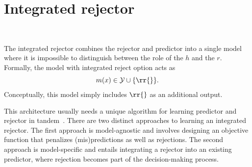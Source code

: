 \section{Integrated rejector}~\label{sec:integrated_rejector}

The integrated rejector combines the rejector and predictor into a single model where it is impossible to distinguish between the role of the $h$ and the $r$.  
Formally, the model with integrated reject option acts as
\begin{equation}
    m(x) \in \mathcal{Y} \cup \{\rr{}\}.
	\label{eq:integrated_rejector}
\end{equation}
Conceptually, this model simply includes $\rr{}$ as an additional output.

This architecture usually needs a unique algorithm for learning predictor  and rejector in tandem~\citep{Cortes2016,Cortes2016b}. 
There are two distinct approaches to learning an integrated rejector. The first approach is model-agnostic and involves designing an objective function that penalizes (mis)predictions as well as rejections. The second approach is model-specific and entails integrating a rejector into an existing predictor, where rejection becomes part of the decision-making process.

